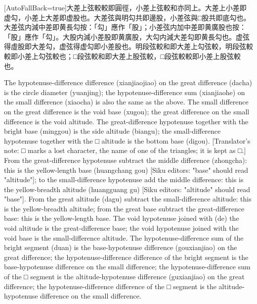 \documentclass[11pt]{article}
\newcommand{\zhsmall}{\footnotesize\color{black!70}}
\newcommand{\unitlabel}[1]{\marginpar{\raggedleft\tiny\color{gray}#1}}
\newenvironment{unitzh}{\par\CJKfontspec{Noto Serif CJK SC}[AutoFallBack=true]\large\linespread{1.25}\selectfont}{\par}
\newenvironment{uniten}{\par\small\color{black!85}}{\par\medskip}
\begin{document}
\begin{unitzh}\unitlabel{ceyuan-004.1}大差上弦較較即圓徑，小差上弦較和亦同上。大差上小差即虚勾，小差上大差即虚股也。大差弦與明勾共即邊股，小差弦與□股共即底勾也。大差弦内減中差即黄長勾{\zhsmall 按：「勾」應作「股」}；小差弦内加中差即黄廣股也{\zhsmall 按：「股」應作「勾」}。大股内減小差股即黄廣股，大勾内減大差勾即黄長勾也。虚弦得虛股即大差勾，虚弦得虚勾即小差股也。明段弦較和即大差上勾弦較，明段弦較較即小差上勾弦較也；□段弦較和即大差上股弦較，□段弦較較即小差上股弦較也。\end{unitzh}
\begin{uniten}The hypotenuse-difference difference (xianjiaojiao) on the great difference (dacha) is the circle diameter (yuanjing); the hypotenuse-difference sum (xianjiaohe) on the small difference (xiaocha) is also the same as the above. The small difference on the great difference is the void base (xugou); the great difference on the small difference is the void altitude. The great-difference hypotenuse together with the bright base (minggou) is the side altitude (biangu); the small-difference hypotenuse together with the □ altitude is the bottom base (digou). [Translator's note: □ marks a lost character, the name of one of the triangles; it is kept as □.] From the great-difference hypotenuse subtract the middle difference (zhongcha): this is the yellow-length base (huangchang gou) [Siku editors: "base" should read "altitude"]; to the small-difference hypotenuse add the middle difference: this is the yellow-breadth altitude (huangguang gu) [Siku editors: "altitude" should read "base"]. From the great altitude (dagu) subtract the small-difference altitude: this is the yellow-breadth altitude; from the great base subtract the great-difference base: this is the yellow-length base. The void hypotenuse joined with (de) the void altitude is the great-difference base; the void hypotenuse joined with the void base is the small-difference altitude. The hypotenuse-difference sum of the bright segment (duan) is the base-hypotenuse difference (gouxianjiao) on the great difference; the hypotenuse-difference difference of the bright segment is the base-hypotenuse difference on the small difference; the hypotenuse-difference sum of the □ segment is the altitude-hypotenuse difference (guxianjiao) on the great difference; the hypotenuse-difference difference of the □ segment is the altitude-hypotenuse difference on the small difference.\end{uniten}
\end{document}
